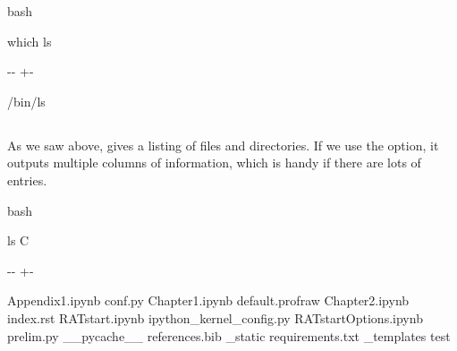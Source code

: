 \documentclass[letterpaper,10pt,english]{sphinxmanual}
\newlength\nbsphinxcodecellspacing
\begin{document}
{
\begin{sphinxVerbatim}[commandchars=\\\{\}]
\llap{\color{nbsphinxin}[7]:\,\hspace{\fboxrule}\hspace{\fboxsep}}\PYGZpc{}\PYGZpc{}bash

which ls
\end{sphinxVerbatim}
}

{

\kern-\sphinxverbatimsmallskipamount\kern-\baselineskip
\kern+\FrameHeightAdjust\kern-\fboxrule
\vspace{\nbsphinxcodecellspacing}

\begin{sphinxVerbatim}[commandchars=\\\{\}]
/bin/ls
\end{sphinxVerbatim}
}


\subsection{}
\label{\detokenize{Appendix1:ls}}
As we saw above,  gives a listing of files and directories. If we use the  option, it outputs multiple columns of information, which is handy if there are lots of entries.

{
\begin{sphinxVerbatim}[commandchars=\\\{\}]
\llap{\color{nbsphinxin}[8]:\,\hspace{\fboxrule}\hspace{\fboxsep}}\PYGZpc{}\PYGZpc{}bash

ls \PYGZhy{}C
\end{sphinxVerbatim}
}

{

\kern-\sphinxverbatimsmallskipamount\kern-\baselineskip
\kern+\FrameHeightAdjust\kern-\fboxrule
\vspace{\nbsphinxcodecellspacing}

\begin{sphinxVerbatim}[commandchars=\\\{\}]
Appendix1.ipynb                 conf.py
Chapter1.ipynb                  default.profraw
Chapter2.ipynb                  index.rst
RATstart.ipynb                  ipython\_kernel\_config.py
RATstartOptions.ipynb           prelim.py
\_\_pycache\_\_                 references.bib
\_static                                requirements.txt
\_templates                     test
\end{sphinxVerbatim}
}
\end{document}
